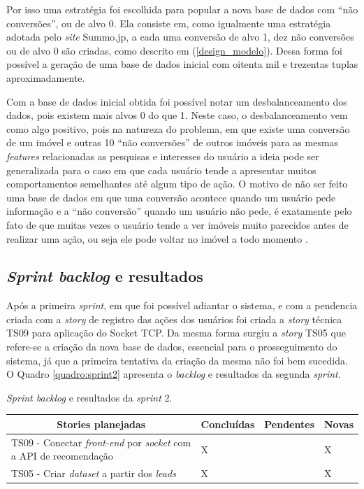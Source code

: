 Por isso uma estratégia foi escolhida para popular a nova base de dados com “não conversões'', ou de alvo 0. Ela consiste em, como igualmente uma estratégia adotada pelo \textit{site} Summo.jp, a cada uma conversão de alvo 1, dez não conversões ou de alvo 0 são criadas, como descrito em (\ref{design_modelo}). Dessa forma foi possível a geração de uma base de dados inicial com oitenta mil e trezentas tuplas aproximadamente.

Com a base de dados inicial obtida foi possível notar um desbalanceamento dos dados, pois existem mais alvos 0 do que 1. Neste caso, o desbalanceamento vem como algo positivo, pois na natureza do problema, em que existe uma conversão de um imóvel e outras 10 “não conversões'' de outros imóveis para as mesmas \textit{features} relacionadas as pesquisas e interesses do usuário a ideia pode ser generalizada para o caso em que cada usuário tende a apresentar muitos comportamentos semelhantes até algum tipo de ação. O motivo de não ser feito uma base de dados em que uma conversão acontece quando um usuário pede informação e a “não conversão'' quando um usuário não pede, é exatamente pelo fato de que muitas vezes o usuário tende a ver imóveis muito parecidos antes de realizar uma ação, ou seja ele pode voltar no imóvel a todo momento \cite{Summo:2017}.

\subsection{\textit{Sprint backlog} e resultados}

Após a primeira \textit{sprint}, em que foi possível adiantar o sistema, e com a pendencia criada com a \textit{story} de registro das ações dos usuários foi criada a \textit{story} técnica TS09 para aplicação do Socket TCP. Da mesma forma surgiu a \textit{story} TS05 que refere-se a criação da nova base de dados, essencial para o prosseguimento do sistema, já que a primeira tentativa da criação da mesma não foi bem sucedida. O Quadro \ref{quadro:sprint2} apresenta o \textit{backlog} e resultados da segunda  \textit{sprint}.

\begin{quadro}[H]
\centering
\caption[\textit{Sprint backlog} e resultados da \textit{sprint} 2]{\textit{Sprint backlog} e resultados da \textit{sprint} 2.}
\label{quadro:sprint2}
\begin{tabular}{|p{6cm}|p{2cm}|p{2cm}|p{1cm}|}
\hline
\multicolumn{1}{|c|}{\textbf{Stories planejadas}} & \multicolumn{1}{c|}{\textbf{Concluídas}} & \multicolumn{1}{c|}{\textbf{Pendentes}} & \multicolumn{1}{c|}{\textbf{Novas}} \\ \hline
TS09 - Conectar \textit{front-end} por \textit{socket} com a API de recomendação & X &  & X \\ \hline
TS05 - Criar \textit{dataset} a partir dos \textit{leads} & X &  & X \\ \hline
\end{tabular}
\end{quadro}


